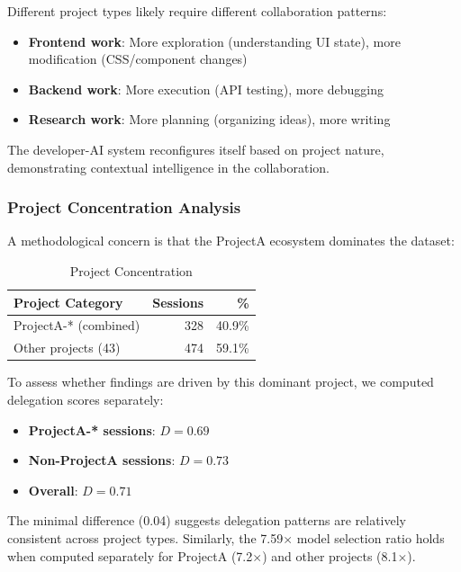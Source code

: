 \documentclass{ntlabs-preprint}
\begin{document}
Different project types likely require different collaboration patterns:
\begin{itemize}
    \item \textbf{Frontend work}: More exploration (understanding UI state), more modification (CSS/component changes)
    \item \textbf{Backend work}: More execution (API testing), more debugging
    \item \textbf{Research work}: More planning (organizing ideas), more writing
\end{itemize}

The developer-AI system reconfigures itself based on project nature, demonstrating contextual intelligence in the collaboration.

\subsubsection{Project Concentration Analysis}

A methodological concern is that the ProjectA ecosystem dominates the dataset:

\begin{table}[h]
\centering
\caption{Project Concentration}
\label{tab:concentration}
\begin{tabular}{lrr}
\toprule
\textbf{Project Category} & \textbf{Sessions} & \textbf{\%} \\
\midrule
ProjectA-* (combined) & 328 & 40.9\% \\
Other projects (43) & 474 & 59.1\% \\
\bottomrule
\end{tabular}
\end{table}

To assess whether findings are driven by this dominant project, we computed delegation scores separately:

\begin{itemize}
    \item \textbf{ProjectA-* sessions}: $D = 0.69$
    \item \textbf{Non-ProjectA sessions}: $D = 0.73$
    \item \textbf{Overall}: $D = 0.71$
\end{itemize}

The minimal difference (0.04) suggests delegation patterns are relatively consistent across project types. Similarly, the 7.59$\times$ model selection ratio holds when computed separately for ProjectA (7.2$\times$) and other projects (8.1$\times$).
\end{document}
